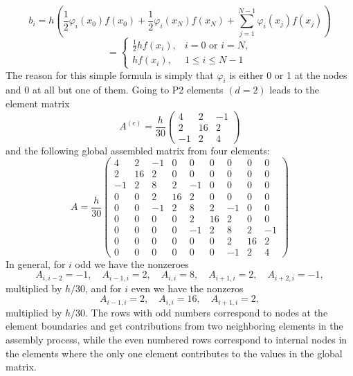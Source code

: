 \documentclass[../main.tex]{subfiles}
\begin{document}
\begin{equation}\label{eqa80}
	b_{i} =h\left(\frac{1}{2} \varphi_{i}\left(x_{0}\right) f\left(x_{0}\right)+\frac{1}{2} \varphi_{i}\left(x_{N}\right) f\left(x_{N}\right)+\sum_{j=1}^{N-1} \varphi_{i}\left(x_{j}\right) f\left(x_{j}\right)\right)
\end{equation}
\begin{equation}\label{eqa81}
	= \begin{cases}\frac{1}{2} h f\left(x_{i}\right), & i=0 \text { or } i=N, \\
		h f\left(x_{i}\right), & 1 \leq i \leq N-1\end{cases}
\end{equation}
The reason for this simple formula is simply that $\varphi_{i}$ is either 0 or 1 at the nodes and 0 at all but one of them.
Going to P2 elements $(d=2)$ leads to the element matrix
\begin{equation}\label{eqa82}
	A^{(e)}=\frac{h}{30}\left(\begin{array}{ccc}
		4 & 2 & -1 \\
		2 & 16 & 2 \\
		-1 & 2 & 4
	\end{array}\right)
\end{equation}
and the following global assembled matrix from four elements:
\begin{equation}\label{eqa83}
	A=\frac{h}{30}\left(\begin{array}{ccccccccc}
		4 & 2 & -1 & 0 & 0 & 0 & 0 & 0 & 0 \\
		2 & 16 & 2 & 0 & 0 & 0 & 0 & 0 & 0 \\
		-1 & 2 & 8 & 2 & -1 & 0 & 0 & 0 & 0 \\
		0 & 0 & 2 & 16 & 2 & 0 & 0 & 0 & 0 \\
		0 & 0 & -1 & 2 & 8 & 2 & -1 & 0 & 0 \\
		0 & 0 & 0 & 0 & 2 & 16 & 2 & 0 & 0 \\
		0 & 0 & 0 & 0 & -1 & 2 & 8 & 2 & -1 \\
		0 & 0 & 0 & 0 & 0 & 0 & 2 & 16 & 2 \\
		0 & 0 & 0 & 0 & 0 & 0 & -1 & 2 & 4
	\end{array}\right)
\end{equation}
In general, for $i$ odd we have the nonzeroes
$$
A_{i, i-2}=-1, \quad A_{i-1, i}=2, \quad A_{i, i}=8, \quad A_{i+1, i}=2, \quad A_{i+2, i}=-1,
$$
multiplied by $h / 30$, and for $i$ even we have the nonzeros
$$
A_{i-1, i}=2, \quad A_{i, i}=16, \quad A_{i+1, i}=2,
$$
multiplied by $h / 30$. The rows with odd numbers correspond to nodes at the element boundaries and get contributions from two neighboring elements in the assembly process, while the even numbered rows correspond to internal nodes in the elements where the only one element contributes to the values in the global matrix.
\end{document}

